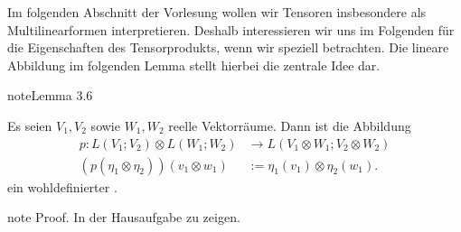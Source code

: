 \documentclass[letterpaper,10pt,german]{jupyterBook}
\begin{document}
\sphinxAtStartPar
Im folgenden Abschnitt der Vorlesung wollen wir Tensoren insbesondere als Multilinearformen interpretieren.
Deshalb interessieren wir uns im Folgenden für die Eigenschaften des Tensorprodukts, wenn wir speziell  betrachten.
Die lineare Abbildung im folgenden Lemma stellt hierbei die zentrale Idee dar.
\label{vektoranalysis/tensor:lem:LISO}
\begin{sphinxadmonition}{note}{Lemma 3.6}



\sphinxAtStartPar
Es seien \(V_1, V_2\) sowie \(W_1, W_2\) reelle Vektorräume.
Dann ist die Abbildung
\begin{equation*}
\begin{split}p:L(V_1; V_2)\otimes L(W_1; W_2) &\rightarrow L(V_1\otimes W_1; V_2\otimes W_2)\\
(p(\eta_1\otimes\eta_2))(v_1\otimes w_1)&:= \eta_1(v_1) \otimes \eta_2(w_1).\end{split}
\end{equation*}
\sphinxAtStartPar
ein wohldefinierter .
\end{sphinxadmonition}

\begin{sphinxadmonition}{note}
\sphinxAtStartPar
Proof. In der Hausaufgabe zu zeigen.
\end{sphinxadmonition}
\end{document}
